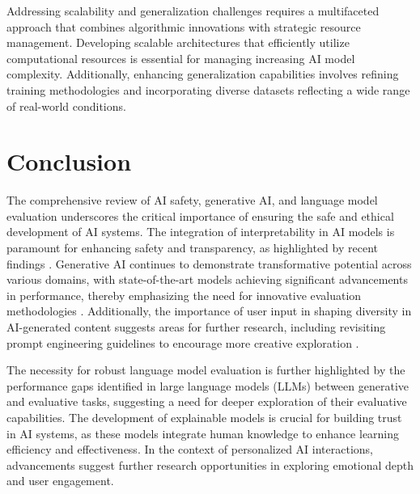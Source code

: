 Addressing scalability and generalization challenges requires a multifaceted approach that combines algorithmic innovations with strategic resource management. Developing scalable architectures that efficiently utilize computational resources is essential for managing increasing AI model complexity. Additionally, enhancing generalization capabilities involves refining training methodologies and incorporating diverse datasets reflecting a wide range of real-world conditions.









\section{Conclusion} \label{sec:Conclusion}







The comprehensive review of AI safety, generative AI, and language model evaluation underscores the critical importance of ensuring the safe and ethical development of AI systems. The integration of interpretability in AI models is paramount for enhancing safety and transparency, as highlighted by recent findings \cite{lin2023interpretabilityframeworksimilarcase}. Generative AI continues to demonstrate transformative potential across various domains, with state-of-the-art models achieving significant advancements in performance, thereby emphasizing the need for innovative evaluation methodologies \cite{wang2023environmenttransformerpolicyoptimization}. Additionally, the importance of user input in shaping diversity in AI-generated content suggests areas for further research, including revisiting prompt engineering guidelines to encourage more creative exploration \cite{palmini2024patternscreativityuserinput}.



The necessity for robust language model evaluation is further highlighted by the performance gaps identified in large language models (LLMs) between generative and evaluative tasks, suggesting a need for deeper exploration of their evaluative capabilities. The development of explainable models is crucial for building trust in AI systems, as these models integrate human knowledge to enhance learning efficiency and effectiveness. In the context of personalized AI interactions, advancements suggest further research opportunities in exploring emotional depth and user engagement.



